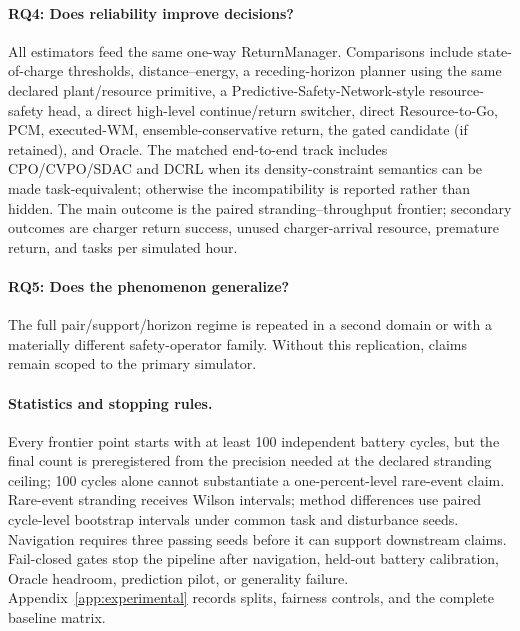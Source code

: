 \paragraph{RQ4: Does reliability improve decisions?}
All estimators feed the same one-way ReturnManager. Comparisons include state-of-charge thresholds, distance--energy, a receding-horizon planner using the same declared plant/resource primitive, a Predictive-Safety-Network-style resource-safety head, a direct high-level continue/return switcher, direct Resource-to-Go, PCM, executed-WM, ensemble-conservative return, the gated candidate (if retained), and Oracle. The matched end-to-end track includes CPO/CVPO/SDAC and DCRL when its density-constraint semantics can be made task-equivalent; otherwise the incompatibility is reported rather than hidden. The main outcome is the paired stranding--throughput frontier; secondary outcomes are charger return success, unused charger-arrival resource, premature return, and tasks per simulated hour.

\paragraph{RQ5: Does the phenomenon generalize?}
The full pair/support/horizon regime is repeated in a second domain or with a materially different safety-operator family. Without this replication, claims remain scoped to the primary simulator.

\paragraph{Statistics and stopping rules.}
Every frontier point starts with at least 100 independent battery cycles, but the final count is preregistered from the precision needed at the declared stranding ceiling; 100 cycles alone cannot substantiate a one-percent-level rare-event claim. Rare-event stranding receives Wilson intervals; method differences use paired cycle-level bootstrap intervals under common task and disturbance seeds. Navigation requires three passing seeds before it can support downstream claims. Fail-closed gates stop the pipeline after navigation, held-out battery calibration, Oracle headroom, prediction pilot, or generality failure. Appendix~\ref{app:experimental} records splits, fairness controls, and the complete baseline matrix.
